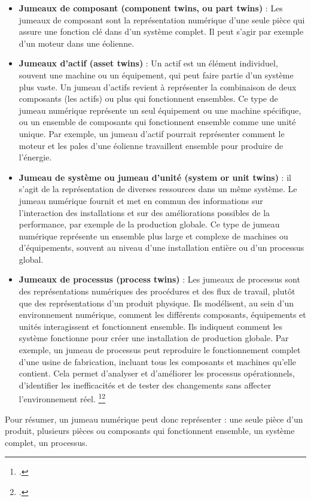 \begin{itemize} 
 \item \textbf{Jumeaux de composant (component twins, ou part twins)} : Les jumeaux de composant sont la représentation numérique d'une seule pièce qui assure une fonction clé dans d'un système complet. Il peut s’agir par exemple d'un moteur dans une éolienne. 
 \item \textbf{Jumeaux d'actif (asset twins)} : Un actif est un élément individuel, souvent une machine ou un équipement, qui peut faire partie d'un système plus vaste. Un jumeau d'actifs revient à représenter la combinaison de deux composants (les actifs) ou plus qui fonctionnent ensembles. Ce type de jumeau numérique représente un seul équipement ou une machine spécifique, ou un ensemble de composants qui fonctionnent ensemble comme une unité unique. Par exemple, un jumeau d'actif pourrait représenter comment le moteur et les pales d'une éolienne travaillent ensemble pour produire de l'énergie.
 \item \textbf{Jumeau de système ou jumeau d’unité (system or unit twins)} : il s’agit de la représentation de diverses ressources dans un même système. Le jumeau numérique fournit et met en commun des informations sur l’interaction des installations et sur des améliorations possibles de la performance, par exemple de la production globale. Ce type de jumeau numérique représente un ensemble plus large et complexe de machines ou d'équipements, souvent au niveau d'une installation entière ou d'un processus global.
 \item \textbf{Jumeaux de processus (process twins)} : Les jumeaux de processus sont des représentations numériques des procédures et des flux de travail, plutôt que des représentations d’un produit physique. Ils modélisent, au sein d’un environnement numérique, comment les différents composants, équipements et unités interagissent et fonctionnent ensemble. Ils indiquent comment les système fonctionne pour créer une installation de production globale. Par exemple, un jumeau de processus peut reproduire le fonctionnement complet d'une usine de fabrication, incluant tous les composants et machines qu'elle contient. Cela permet d'analyser et d'améliorer les processus opérationnels, d'identifier les inefficacités et de tester des changements sans affecter l'environnement réel. \footcite{QuEstceQu2023}\footcite{JumeauNumeriqueLogistique2023}
\end{itemize}

Pour résumer, un jumeau numérique peut donc représenter : une seule pièce d’un produit, plusieurs pièces ou composants qui fonctionnent ensemble, un système complet, un processus.\\

